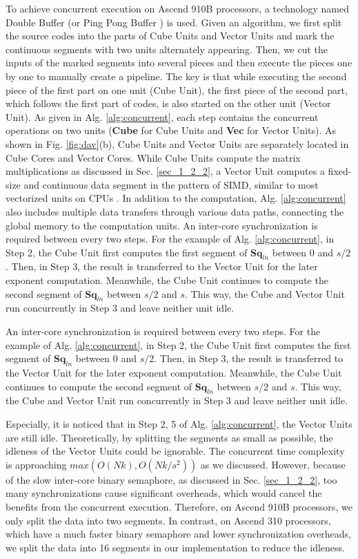 To achieve concurrent execution on Ascend 910B processors, a technology named Double Buffer (or Ping Pong Buffer \cite{DBLP:conf/infocom/JooM98}) is used. Given an algorithm, we first split the source codes into the parts of Cube Units and Vector Units and mark the continuous segments with two units alternately appearing. Then, we cut the inputs of the marked segments into several pieces and then execute the pieces one by one to manually create a pipeline. The key is that while executing the second piece of the first part on one unit (Cube Unit), the first piece of the second part, which follows the first part of codes, is also started on the other unit (Vector Unit). As given in Alg. \ref{alg:concurrent}, each step contains the concurrent operations on two units (\textbf{Cube} for Cube Units and \textbf{Vec} for Vector Units).
As shown in Fig. \ref{fig:dav}(b), Cube Units and Vector Units are separately located in Cube Cores and Vector Cores. While Cube Units compute the matrix multiplications as discussed in Sec. \ref{sec_1_2_2}, a Vector Unit computes a fixed-size and continuous data segment in the pattern of SIMD, similar to most vectorized units on CPUs \cite{avx}. In addition to the computation, Alg. \ref{alg:concurrent} also includes multiple data transfers through various data paths, connecting the global memory to the computation units.
An inter-core synchronization is required between every two steps. For the example of Alg. \ref{alg:concurrent}, in Step 2, the Cube Unit first computes the first segment of $\textbf{Sq}_{ln}$ between $0$ and $s / 2$. Then, in Step 3, the result is transferred to the Vector Unit for the later exponent computation. Meanwhile, the Cube Unit continues to compute the second segment of $\textbf{Sq}_{ln}$ between $s / 2$ and $s$. This way, the Cube and Vector Unit run concurrently in Step 3 and leave neither unit idle.


An inter-core synchronization is required between every two steps. For the example of Alg. \ref{alg:concurrent}, in Step 2, the Cube Unit first computes the first segment of $\textbf{Sq}_{ln}$ between $0$ and $s / 2$. Then, in Step 3, the result is transferred to the Vector Unit for the later exponent computation. Meanwhile, the Cube Unit continues to compute the second segment of $\textbf{Sq}_{ln}$ between $s / 2$ and $s$. This way, the Cube and Vector Unit run concurrently in Step 3 and leave neither unit idle.

Especially, it is noticed that in Step 2, 5 of Alg. \ref{alg:concurrent}, the Vector Units are still idle. Theoretically, by splitting the segments as small as possible, the idleness of the Vector Units could be ignorable. The concurrent time complexity is approaching $max(O(Nk), O(Nk / s^2))$ as we discussed. However, because of the slow inter-core binary semaphore, as discussed in Sec. \ref{sec_1_2_2}, too many synchronizations cause significant overheads, which would cancel the benefits from the concurrent execution. Therefore, on Ascend 910B processors, we only split the data into two segments. In contrast, on Ascend 310 processors, which have a much faster binary semaphore and lower synchronization overheads, we split the data into 16 segments in our implementation to reduce the idleness.

